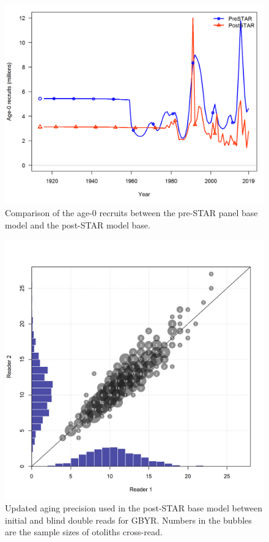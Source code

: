 \documentclass[12pt,]{article}
\begin{document}
\begin{figure}
\centering
\includegraphics{Figures/preSTAR_postSTAR_compare_recruit}
\caption{Comparison of the age-0 recruits between the pre-STAR panel
base model and the post-STAR model base.
\label{fig:preSTAR_postSTAR_compare_recruit}}
\end{figure}

\FloatBarrier

\begin{figure}
\centering
\includegraphics{Figures/GBY_age_error_updated.png}
\caption{Updated aging precision used in the post-STAR base model
between initial and blind double reads for GBYR. Numbers in the bubbles
are the sample sizes of otoliths cross-read.
\label{fig:GBY_age_error_updated}}
\end{figure}
\end{document}
